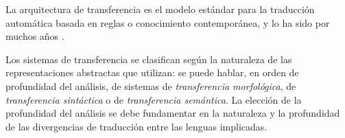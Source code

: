 La arquitectura de transferencia es el modelo estándar para la traducción automática basada en reglas o conocimiento contemporánea, y lo ha sido por muchos años \citep{arnold93j}. 

Los sistemas de transferencia se clasifican según la naturaleza de las representaciones abstractas que utilizan: se puede hablar, en orden de profundidad del análisis, de sistemas de \emph{transferencia morfológica}, de \emph{transferencia sintáctica} o de {\em transferencia semántica}. La elección de la profundidad del análisis se debe fundamentar en la naturaleza y la profundidad de las divergencias de traducción \citep{vandooren93b} entre las lenguas implicadas. 


